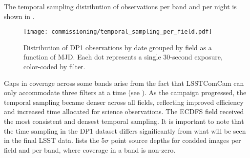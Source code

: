 The temporal sampling distribution of observations per band and per night is shown in .
\begin{figure}[htb!]
\centering
\texttt{[image: commissioning/temporal\_sampling\_per\_field.pdf]}
\caption{Distribution of DP1 observations by date grouped by field as a function of MJD.  Each dot represents a single 30-second exposure, color-coded by filter.}	
\label{fig:target_fields_temporal_sampling}
\vspace{0.1cm}
\end{figure}
Gaps in coverage across some bands arise from the fact that \gls{LSSTComCam} can only accommodate three filters at a time (see ).
As the campaign progressed, the temporal sampling became denser across all fields, reflecting improved efficiency and increased time allocated for science observations.
The \gls{ECDFS} field received the most consistent and densest temporal sampling.
It is important to note that the time sampling in the \gls{DP1} dataset differs significantly from what will be seen in the final \gls{LSST} data.
 lists the  5$\sigma$ point source depths for coadded images per field and per band, where coverage in a band is non-zero. 



